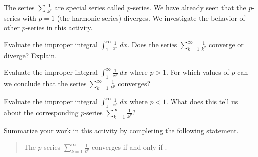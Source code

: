 \begin{activity} \label{8.3.Act5} The series $\sum \frac{1}{k^p}$ are special series called $p$-series. We have already seen that the $p$-series with $p=1$ (the harmonic series) diverges. We investigate the behavior of other $p$-series in this activity.
\ba
    \item Evaluate the improper integral $ \int_1^{\infty} \frac{1}{x^2} \ dx$. Does the series $ \sum_{k=1}^{\infty} \frac{1}{k^2}$
converge or diverge? Explain.


    \item Evaluate the improper integral $ \int_1^{\infty} \frac{1}{x^p} \ dx$ where $p > 1$. For which values of $p$ can we conclude that the series $ \sum_{k=1}^{\infty} \frac{1}{k^p}$
converges? 

    \item Evaluate the improper integral $ \int_1^{\infty} \frac{1}{x^p} \ dx$ where $p < 1$. What does this tell us about the corresponding $p$-series
$ \sum_{k=1}^{\infty} \frac{1}{k^p}$?

\item Summarize your work in this activity by completing the following statement.
\begin{quote}
The $p$-series $ \sum_{k=1}^{\infty} \frac{1}{k^p}$ converges if and only if \underline{\hspace{2in}}.
\end{quote}

\ea
\end{activity}

